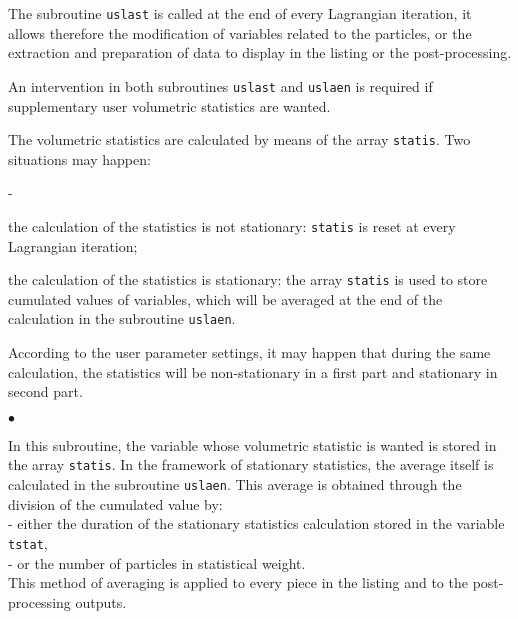 {{{\noindent
The subroutine \texttt{uslast} is called at the end of every Lagrangian
iteration, it allows therefore the modification of variables related to
the particles, or the extraction and preparation of data to display in
the listing or the post-processing.

\noindent
An intervention in both subroutines \texttt{uslast} and \texttt{uslaen}
is required if supplementary user volumetric statistics are wanted.


\noindent
The volumetric statistics are calculated by means of the array \texttt{statis}. Two
situations may happen:
\begin{list}{-}{}
\item the calculation of the statistics is not stationary: \texttt{statis} is
      reset at every Lagrangian iteration;
\item the calculation of the statistics is stationary: the array
      \texttt{statis} is used to store cumulated values of variables, which will
      be averaged at the end of the calculation in the subroutine
      \texttt{uslaen}.
\end{list}
According to the user parameter settings, it may happen that during the
same calculation, the statistics will be non-stationary in a first part and
stationary in second part.

\begin{list}{$\bullet$}{}
\item{}
\noindent

\noindent
In this subroutine, the variable whose volumetric statistic is wanted is
stored in the array \texttt{statis}. In the framework of stationary statistics,
the average itself is calculated in the subroutine \texttt{uslaen}. This
average is obtained through the division of the cumulated value by: \\
\hspace*{1cm}- either the duration of the stationary statistics
     calculation stored in the variable \texttt{tstat}, \\
\hspace*{1cm}- or the number of particles in statistical weight. \\
This method of averaging is applied to every piece in the listing and
     to the post-processing outputs.

\item{}


\end{list}}}}
